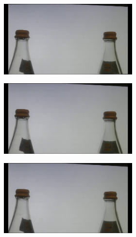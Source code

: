 \begin{figure}[!tbp]
\begin{subfigure}[b]{\textwidth}
\begin{subfigure}[b]{0.180\textwidth}
        \end{subfigure}
        \begin{subfigure}[b]{0.180\textwidth}%
          \includegraphics[width=1\linewidth]{images/results/poststab-1.jpg}
        \end{subfigure}
        \begin{subfigure}[b]{0.180\textwidth}%
          \includegraphics[width=1\linewidth]{images/results/poststab-2.jpg}
        \end{subfigure}
        \begin{subfigure}[b]{0.180\textwidth}%
          \includegraphics[width=1\linewidth]{images/results/poststab-3.jpg}

\end{subfigure}
\end{subfigure}
\end{figure}
